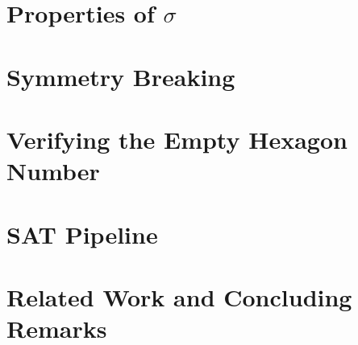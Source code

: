 \documentclass[a4paper, USenglish, cleveref, autoref, thm-restate]{lipics-v2021}
\begin{document}
\section{Properties of $\sigma$}\label{sec:properties-of-sigma}


% 

\section{Symmetry Breaking}\label{sec:symmetry-breaking}


\section{Verifying the Empty Hexagon Number}\label{sec:empty-hexagon-number}


\section{SAT Pipeline}\label{sec:leansat}



\section{Related Work and Concluding Remarks}\label{sec:related-work-and-conclusions}



\end{document}
